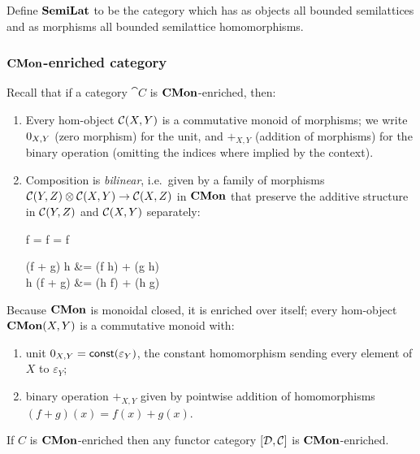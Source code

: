\begin{definition}
Define $\mathbf{SemiLat}$ to be the category which has as objects all bounded semilattices and as morphisms all
bounded semilattice homomorphisms.
\end{definition}

\subsubsection{$\mathbf{CMon}$-enriched category}

Recall that if a category $\cat{C}$ is $\mathbf{CMon}$-enriched, then:
\begin{enumerate}
\item Every hom-object ${\mathcal{C}}(X,Y)$ is a commutative monoid of morphisms; we write $0_{X,Y}$
(zero morphism) for the unit, and $+_{X,Y}$ (addition of morphisms) for the binary operation (omitting the
indices where implied by the context).
\item Composition is \emph{bilinear}, i.e.~given by a family of morphisms ${\mathcal{C}}(Y,Z) \otimes
{\mathcal{C}}(X,Y) \to {\mathcal{C}}(X,Z)$ in $\mathbf{CMon}$ that preserve the additive structure in
${\mathcal{C}}(Y,Z)$ and ${\mathcal{C}}(X,Y)$ separately:

\begin{salign*}
f \comp \zero = f = \zero \comp f
\end{salign*}
\begin{salign*}
(f + g) \comp h &= (f \comp h) + (g \comp h) \\
h \comp (f + g) &= (h \comp f) + (h \comp g)
\end{salign*}
\end{enumerate}

Because $\mathbf{CMon}$ is monoidal closed, it is enriched over itself; every hom-object ${\mathbf{CMon}}(X,Y)$ is a
commutative monoid with:

\begin{enumerate}
\item unit $0_{X,Y} = \mathsf{const}(\varepsilon_Y)$, the constant homomorphism sending every element of $X$ to
$\varepsilon_Y$;
\item binary operation $+_{X,Y}$ given by pointwise addition of homomorphisms $(f + g)(x) = f(x) + g(x)$.
\end{enumerate}

\begin{proposition}
If $C$ is $\mathbf{CMon}$-enriched then any functor category $[\mathcal{D},\mathcal{C}]$ is $\mathbf{CMon}$-enriched.
\end{proposition}

